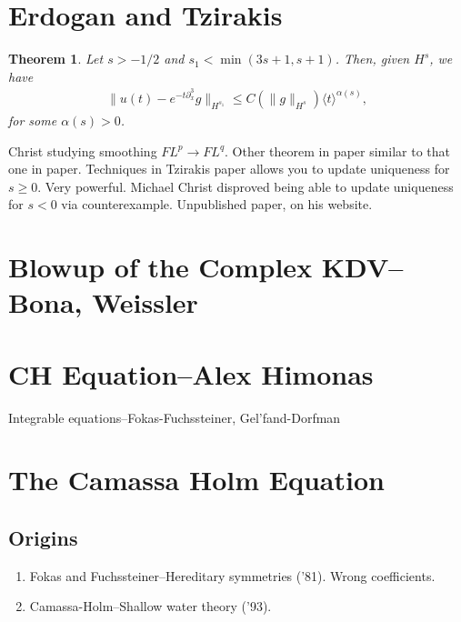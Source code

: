 \documentclass[12pt,reqno]{amsart}
\numberwithin{equation}{section}  %
\newcommand{\p}{\partial}
\newtheorem{theorem}{Theorem}[section]
\begin{document}
\section{Erdogan and Tzirakis}
%
%
%
%
%                
%
%
%
%
\begin{theorem}
    Let $s > -1/2$ and $s_{1} < \min(3s+1, s+1)$. Then, given $H^{s}$, we
    have
    \begin{equation*}
	\begin{split}
	    \| u(t) - e^{-t \p_{x}^{3}}g \|_{H^{s_{1}}} \le C (\| g
	    \|_{H^{s}}) \langle t \rangle^{\alpha(s)},
	\end{split}
    \end{equation*}
    for some $\alpha(s) > 0$.
    \label{thm:main3}
\end{theorem}
%
%
Christ studying smoothing $FL^{p} \to FL^{q}$. Other theorem in paper
similar to that one in paper.
Techniques in Tzirakis paper allows you to update uniqueness for $s \ge 0$.
Very powerful.  Michael Christ disproved being able to update uniqueness
for $s < 0$ via counterexample. Unpublished paper, on his website.
%
%
%
%
%
%
%
%
\section{Blowup of the Complex KDV--Bona, Weissler} 
\label{sec:kdv-blowup}
%
%
%
%
%
%
%
%
\section{CH Equation--Alex Himonas} 
\label{sec:him}
Integrable equations--Fokas-Fuchssteiner, Gel'fand-Dorfman



%
%
%
\section{The Camassa Holm Equation}
\label{sec:ch}
\subsection{Origins}
\label{ssec:origins}
\begin{enumerate}
    \item
	Fokas and Fuchssteiner--Hereditary symmetries ('81). Wrong coefficients.
    \item Camassa-Holm--Shallow water theory ('93).
\end{enumerate}
\end{document}
